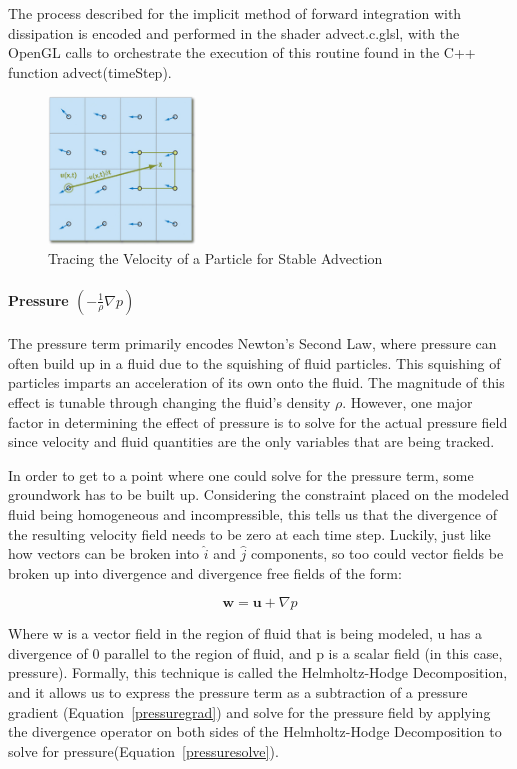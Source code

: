 \documentclass[conference]{IEEEtran}
\begin{document}
The process described for the implicit method of forward integration with dissipation is encoded and performed in the shader advect.c.glsl, with the OpenGL calls to orchestrate the execution of this routine found in the C++ function advect(timeStep).


\begin{figure}[htbp]
\centerline{\includegraphics[width=0.35\textwidth]{advection.jpg}}
\caption{Tracing the Velocity of a Particle for Stable Advection\cite{navierstokes}}
\label{advection}
\end{figure}

\paragraph{Pressure $(-\frac{1}{\rho} \nabla p)$} The pressure term primarily encodes Newton's Second Law, where pressure can often build up in a fluid due to the squishing of fluid particles. This squishing of particles imparts an acceleration of its own onto the fluid. The magnitude of this effect is tunable through changing the fluid's density $\rho$. However, one major factor in determining the effect of pressure is to solve for the actual pressure field since velocity and fluid quantities are the only variables that are being tracked.

In order to get to a point where one could solve for the pressure term, some groundwork has to be built up. Considering the constraint placed on the modeled fluid being homogeneous and incompressible, this tells us that the divergence of the resulting velocity field needs to be zero at each time step. Luckily, just like how vectors can be broken into $\hat{i}$ and $\hat{j}$ components, so too could vector fields be broken up into divergence and divergence free fields of the form:

\begin{equation}
	\mathbf{w}=\mathbf{u}+\nabla p
\end{equation}

Where w is a vector field in the region of fluid that is being modeled, u has a divergence of 0 parallel to the region of fluid, and p is a scalar field (in this case, pressure). Formally, this technique is called the Helmholtz-Hodge Decomposition, and it allows us to express the pressure term as a subtraction of a pressure gradient (Equation~\eqref{pressuregrad}) and solve for the pressure field by applying the divergence operator on both sides of the Helmholtz-Hodge Decomposition to solve for pressure(Equation~\eqref{pressuresolve}).
\end{document}
